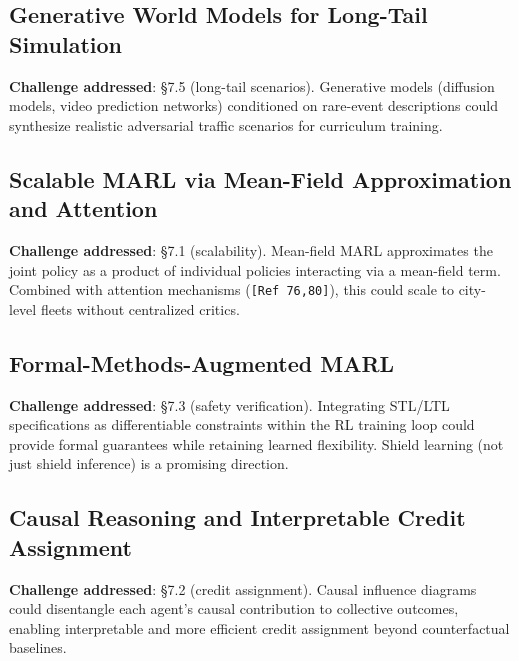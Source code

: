 \documentclass[12pt, a4paper]{article}
\begin{document}
\subsection{Generative World Models for Long-Tail Simulation}

\begin{outline_note}
\textbf{Challenge addressed}: \S7.5 (long-tail scenarios).
Generative models (diffusion models, video prediction networks)
conditioned on rare-event descriptions could synthesize realistic
adversarial traffic scenarios for curriculum training.
\end{outline_note}

\subsection{Scalable MARL via Mean-Field Approximation and Attention}

\begin{outline_note}
\textbf{Challenge addressed}: \S7.1 (scalability).
Mean-field MARL approximates the joint policy as a product of
individual policies interacting via a mean-field term.  Combined
with attention mechanisms (\texttt{[Ref\,76,80]}), this could scale
to city-level fleets without centralized critics.
\end{outline_note}

\subsection{Formal-Methods-Augmented MARL}

\begin{outline_note}
\textbf{Challenge addressed}: \S7.3 (safety verification).
Integrating STL/LTL specifications as differentiable constraints
within the RL training loop could provide formal guarantees while
retaining learned flexibility.  Shield learning (not just shield
inference) is a promising direction.
\end{outline_note}

\subsection{Causal Reasoning and Interpretable Credit Assignment}

\begin{outline_note}
\textbf{Challenge addressed}: \S7.2 (credit assignment).
Causal influence diagrams could disentangle each agent's causal
contribution to collective outcomes, enabling interpretable
and more efficient credit assignment beyond counterfactual baselines.
\end{outline_note}
\end{document}
